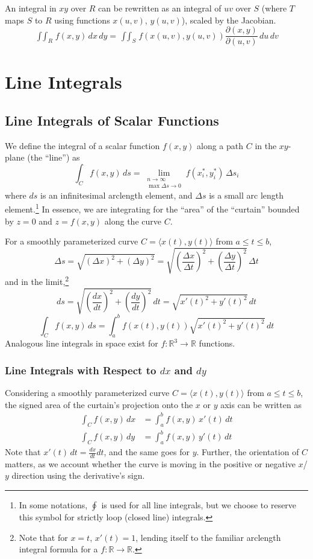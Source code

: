 \documentclass{article}
\begin{document}
An integral in $xy$ over $R$ can be rewritten as an integral of $uv$ over $S$ (where $T$ maps $S$ to $R$ using functions $x(u,v)$, $y(u,v)$), scaled by the Jacobian.
$$\mathop{\int\int}_Rf(x,y)\,dx\,dy=\mathop{\int\int}_Sf(x(u,v), y(u,v))\frac{\partial(x,y)}{\partial(u,v)}\,du\,dv$$

\section{Line Integrals}
\subsection{Line Integrals of Scalar Functions}
We define the integral of a scalar function $f(x,y)$ along a path $C$ in the $xy$-plane (the ``line'') as
$$\int_C f(x,y)\,ds = \lim_{\substack{n\to\infty\\\max \Delta{s}\to0}}f(x_i^*,y_i^*)\,\Delta{s}_i$$
where $ds$ is an infinitesimal arclength element, and $\Delta{s}$ is a small arc length element.\footnote{In some notations, $\oint$ is used for all line integrals, but we choose to reserve this symbol for strictly loop (closed line) integrals.} In essence, we are integrating for the ``area'' of the ``curtain'' bounded by $z=0$ and $z=f(x,y)$ along the curve $C$.

For a smoothly parameterized curve $C=\langle x(t),y(t)\rangle$ from $a\le t \le b$,
\[
    \Delta{s}=\sqrt{(\Delta{x})^2+(\Delta y)^2} = \sqrt{\left(\frac{\Delta{x}}{\Delta t}\right)^2+\left(\frac{\Delta{y}}{\Delta t}\right)^2}\,\Delta t
\]
and in the limit,\footnote{Note that for $x=t$, $x'(t) = 1$, lending itself to the familiar arclength integral formula for a $f:\mathbb{R}\to\mathbb{R}$.} \[ds = \sqrt{\left(\frac{dx}{dt}\right)^2+\left(\frac{dy}{dt}\right)^2}\,dt = \sqrt{x'(t)^2 + y'(t)^2}\,dt\]
$$\int_Cf(x,y)\,ds=\int_a^bf(x(t),y(t))\sqrt{x'(t)^2 + y'(t)^2}\,dt$$
Analogous line integrals in space exist for $f: \mathbb{R}^3\to\mathbb{R}$ functions.

\subsubsection{Line Integrals with Respect to \texorpdfstring{$dx$ and $dy$}{dx and dy}}
Considering a smoothly parameterized curve $C=\langle x(t),y(t)\rangle$ from $a\le t \le b$, the signed area of the curtain's projection onto the $x$ or $y$ axis can be written as
\begin{align*}
    \int_Cf(x,y)\,dx&=\int_a^bf(x,y)\,x'(t)\,dt\\
    \int_Cf(x,y)\,dy&=\int_a^bf(x,y)\,y'(t)\,dt
\end{align*}
Note that $x'(t)\,dt=\frac{dx}{dt}dt$, and the same goes for $y$. Further, the orientation of $C$ matters, as we account whether the curve is moving in the positive or negative $x$/$y$ direction using the derivative's sign.
\end{document}
